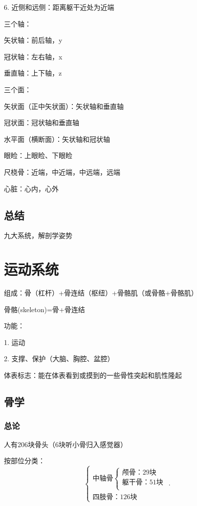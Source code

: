 6. 近侧和远侧：距离躯干近处为近端
\begin{notation}
    三个轴：

    矢状轴：前后轴，y

    冠状轴：左右轴，x

    垂直轴：上下轴，z

    三个面：

    矢状面（正中矢状面）：矢状轴和垂直轴

    冠状面：冠状轴和垂直轴

    水平面（横断面）：矢状轴和冠状轴
\end{notation}
\begin{eg}
    眼睑：上眼睑、下眼睑

    尺桡骨：近端，中近端，中远端，远端

    心脏：心内，心外
\end{eg}
\subsection{总结}%
\label{sub:总结}
九大系统，解剖学姿势

\section{运动系统}%
\label{sec:运动系统}
组成：骨（杠杆）+骨连结（枢纽）+骨骼肌（或骨骼+骨骼肌）

骨骼(skeleton)=骨+骨连结

\begin{notation}
    功能：

    1. 运动

    2. 支撑、保护（大脑、胸腔、盆腔）
\end{notation}
\begin{notation}
    体表标志：能在体表看到或摸到的一些骨性突起和肌性隆起
\end{notation}

\subsection{骨学}%
\label{sub:骨学}
\subsubsection{总论}%
\label{subsub:总论}
人有206块骨头（6块听小骨归入感觉器）

按部位分类：
\[
    \begin{cases}
    \mbox{中轴骨}
    \begin{cases}
        \mbox{颅骨：29块}\\ 
        \mbox{躯干骨：51块}\\ 
    \end{cases}\\
    \mbox{四肢骨：126块}
    \end{cases}
.\] 

